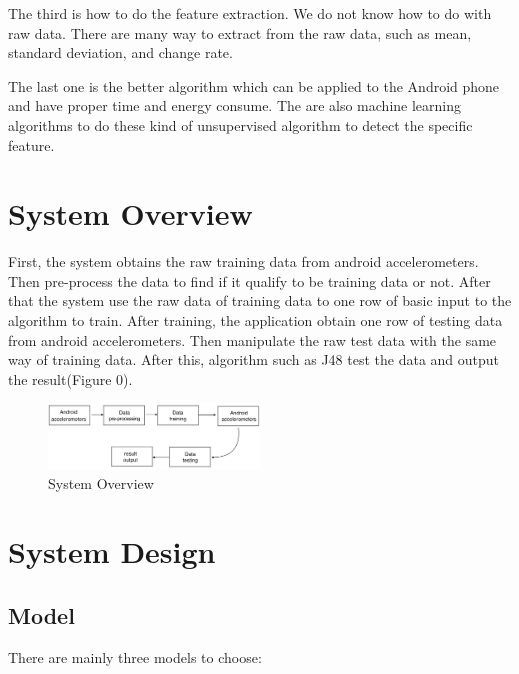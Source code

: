 \documentclass[12pt,twocolumn]{article}
\begin{document}
The third is how to do the feature extraction. We do not know how to do with raw data. There are many way to extract from the raw data, such as mean, standard deviation, and change rate.

The last one is the better algorithm which can be applied to the Android phone and have proper time and energy consume. The are also machine learning algorithms to do these kind of unsupervised algorithm to detect the specific feature.

\section{System Overview}
First, the system obtains the raw training data from android accelerometers. Then pre-process the data to find if it qualify to be training data or not. After that the system use the raw data of training data to one row of basic input to the algorithm to train. After training, the application obtain one row of testing data from android accelerometers. Then manipulate the raw test data with the same way of training data. After this, algorithm such as J48 test the data and output the result(Figure 0).

\begin{figure}[htbp]
\centering
\includegraphics[width=0.5\textwidth]{system_overview}
\caption{System Overview}
\label{fig:system_overview}
\end{figure}

\section{System Design}

\subsection{Model}
There are mainly three models to choose:
\end{document}
